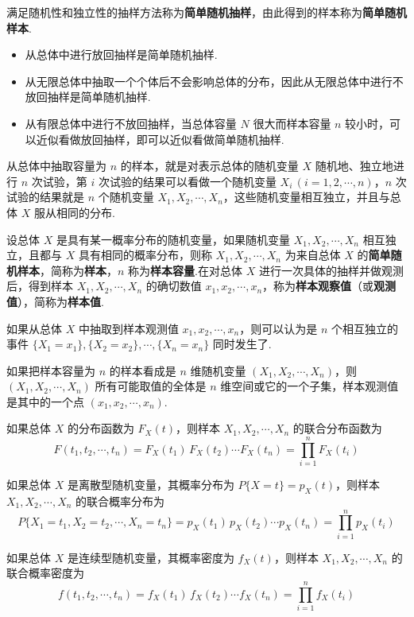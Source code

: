 满足随机性和独立性的抽样方法称为\textbf{简单随机抽样}，由此得到的样本称为\textbf{简单随机样本}.

\begin{itemize}
    \item 从总体中进行放回抽样是简单随机抽样.
    \item 从无限总体中抽取一个个体后不会影响总体的分布，因此从无限总体中进行不放回抽样是简单随机抽样.
    \item 从有限总体中进行不放回抽样，当总体容量 $N$ 很大而样本容量 $n$ 较小时，可以近似看做放回抽样，即可以近似看做简单随机抽样.
\end{itemize}

从总体中抽取容量为 $n$ 的样本，就是对表示总体的随机变量 $X$ 随机地、独立地进行 $n$ 次试验，第 $i$ 次试验的结果可以看做一个随机变量 $X_i \, (i=1,2,\cdots,n)$，$n$ 次试验的结果就是 $n$ 个随机变量 $X_1,X_2,\cdots,X_n$，这些随机变量相互独立，并且与总体 $X$ 服从相同的分布.

\begin{definition}
    设总体 $X$ 是具有某一概率分布的随机变量，如果随机变量 $X_1,X_2,\cdots,X_n$ 相互独立，且都与 $X$ 具有相同的概率分布，则称 $X_1,X_2,\cdots,X_n$ 为来自总体 $X$ 的\textbf{简单随机样本}，简称为\textbf{样本}，$n$ 称为\textbf{样本容量}.在对总体 $X$ 进行一次具体的抽样并做观测后，得到样本 $X_1,X_2,\cdots,X_n$ 的确切数值 $x_1,x_2,\cdots,x_n$，称为\textbf{样本观察值}（或\textbf{观测值}），简称为\textbf{样本值}.
\end{definition}

如果从总体 $X$ 中抽取到样本观测值 $x_1,x_2,\cdots,x_n$，则可以认为是 $n$ 个相互独立的事件 $\{X_1=x_1\}, \{X_2=x_2\}, \cdots, \{X_n=x_n\}$ 同时发生了.

如果把样本容量为 $n$ 的样本看成是 $n$ 维随机变量 $(X_1,X_2,\cdots,X_n)$，则 $(X_1,X_2,\cdots,X_n)$ 所有可能取值的全体是 $n$ 维空间或它的一个子集，样本观测值是其中的一个点 $(x_1,x_2,\cdots,x_n)$.

如果总体 $X$ 的分布函数为 $F_X(t)$，则样本 $X_1,X_2,\cdots,X_n$ 的联合分布函数为
$$
F(t_1,t_2,\cdots,t_n) = F_X(t_1) \, F_X(t_2) \cdots F_X(t_n) = \prod_{i=1}^{n} F_X(t_i)
$$

如果总体 $X$ 是离散型随机变量，其概率分布为 $P \{ X=t \} = p_X(t)$，则样本 $X_1,X_2,\cdots,X_n$ 的联合概率分布为
$$
P \{ X_1=t_1, X_2=t_2, \cdots, X_n=t_n \} = p_X(t_1) \, p_X(t_2) \cdots p_X(t_n) = \prod_{i=1}^n p_X(t_i)
$$

如果总体 $X$ 是连续型随机变量，其概率密度为 $f_X(t)$，则样本 $X_1,X_2,\cdots,X_n$ 的联合概率密度为
$$
f(t_1,t_2,\cdots,t_n) = f_X(t_1) \, f_X(t_2) \cdots f_X(t_n) = \prod_{i=1}^n f_X(t_i)
$$

